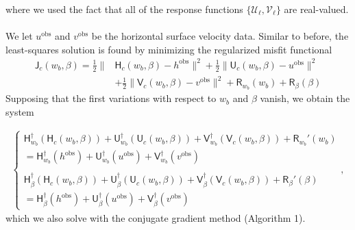 \documentclass[paper=a4, fontsize=11pt]{article}
\begin{document}
where we used the fact that all of the response functions $\{\mathcal{U}_\ell,\mathcal{V}_\ell\}$
are real-valued.\\ \\
We let $u^\mathrm{obs}$ and $v^\mathrm{obs}$ be the horizontal surface velocity data.
Similar to before, the least-squares solution is found by minimizing the regularized misfit functional
\begin{align}
\mathsf{J}_c(w_b,\beta)  =  \frac{1}{2}\|& \mathsf{H}_c(w_b,\beta) - h^{\mathrm{obs}} \|^2 +
 \frac{1}{2}\| \mathsf{U}_c(w_b,\beta) - u^{\mathrm{obs}} \|^2 \\ & +
  \frac{1}{2}\| \mathsf{V}_c(w_b,\beta) - v^{\mathrm{obs}} \|^2 +
\mathsf{R}_{w_b}(w_b) +\mathsf{R}_\beta(\beta) \label{lsq}
\end{align}
Supposing that the first variations with respect to $w_b$ and $\beta$ vanish,
we obtain the system

\begin{align}
\begin{cases}
\mathsf{H}_{w_b}^\dagger (\mathsf{H}_c(w_b,\beta))
+\mathsf{U}_{w_b}^\dagger (\mathsf{U}_c(w_b,\beta))
+\mathsf{V}_{w_b}^\dagger (\mathsf{V}_c(w_b,\beta))  + \mathsf{R}_{w_b}'(w_b)   \\
= \mathsf{H}_{w_b}^\dagger (h^{\mathrm{obs}}) + \mathsf{U}_{w_b}^\dagger (u^{\mathrm{obs}})
+\mathsf{V}_{w_b}^\dagger (v^{\mathrm{obs}}) \\ \\
\mathsf{H}_{\beta}^\dagger (\mathsf{H}_c(w_b,\beta))
+\mathsf{U}_{\beta}^\dagger (\mathsf{U}_c(w_b,\beta))
+\mathsf{V}_{\beta}^\dagger (\mathsf{V}_c(w_b,\beta))  + \mathsf{R}_{\beta}'(\beta)   \\
= \mathsf{H}_{\beta}^\dagger (h^{\mathrm{obs}}) + \mathsf{U}_{\beta}^\dagger (u^{\mathrm{obs}})
+\mathsf{V}_{\beta}^\dagger (v^{\mathrm{obs}})
\end{cases},
\end{align}
which we also solve with the conjugate gradient method (Algorithm 1).

\newpage
\end{document}
